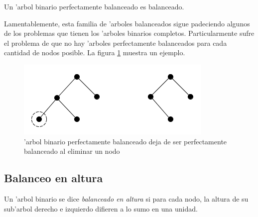 \begin{coro}
	Un 'arbol binario perfectamente balanceado es balanceado.
\end{coro}

Lamentablemente, esta familia de 'arboles balanceados sigue padeciendo algunos de los problemas que tienen los 'arboles binarios completos. Particularmente sufre el problema de que no hay 'arboles perfectamente balanceados para cada cantidad de nodos posible. La figura \ref{fig4} muestra un ejemplo.

\begin{figure}[h]
	\begin{center}
	\includegraphics[scale=0.6]{imagenes/fig4.jpg}
	\end{center}
	\caption{'arbol binario perfectamente balanceado deja de ser perfectamente balanceado al eliminar un nodo}
	\label{fig4}
\end{figure}

\subsection{Balanceo en altura}

\begin{defi}
	Un 'arbol binario se dice \textit{balanceado en altura} si para cada nodo, la altura de su sub'arbol derecho e izquierdo difieren a lo sumo en una unidad.
\end{defi}


